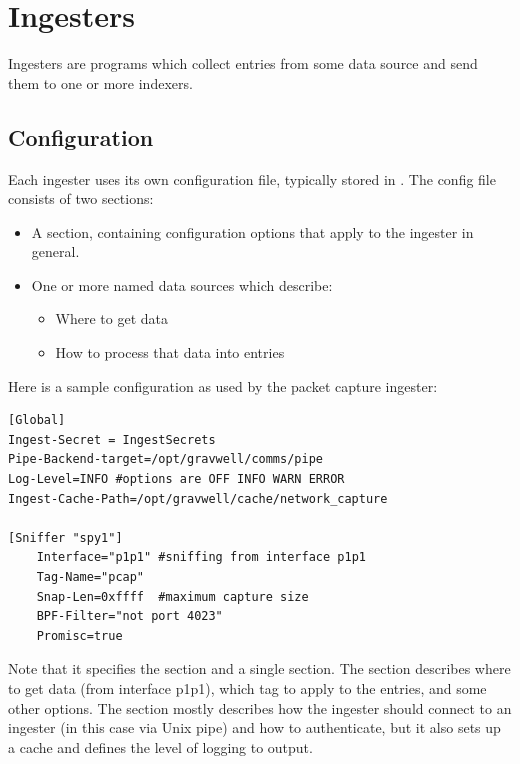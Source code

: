 \chapter{Ingesters}
Ingesters are programs which collect entries from some data source and
send them to one or more indexers.

\section{Configuration}
\label{sec:global-config}

Each ingester uses its own configuration file, typically stored in
. The config file consists of two sections:

\begin{itemize}
\item
  A \code{[Global]} section, containing configuration options that
  apply to the ingester in general.
\item
  One or more named data sources which describe:
	\begin{itemize}
	\item Where to get data
	\item How to process that data into entries
	\end{itemize}
\end{itemize}

Here is a sample configuration as used by the packet capture ingester:

\begin{Verbatim}[breaklines=true]
[Global]
Ingest-Secret = IngestSecrets
Pipe-Backend-target=/opt/gravwell/comms/pipe
Log-Level=INFO #options are OFF INFO WARN ERROR
Ingest-Cache-Path=/opt/gravwell/cache/network_capture

[Sniffer "spy1"]
    Interface="p1p1" #sniffing from interface p1p1
    Tag-Name="pcap"
    Snap-Len=0xffff  #maximum capture size
    BPF-Filter="not port 4023"
    Promisc=true
\end{Verbatim}

Note that it specifies the \code{[Global]} section and a single
\code{[Sniffer]} section. The \code{[Sniffer]} section describes where to get
data (from interface p1p1), which tag to apply to the entries, and some
other options. The \code{[Global]} section mostly describes how the
ingester should connect to an ingester (in this case via Unix pipe) and
how to authenticate, but it also sets up a cache and defines the level
of logging to output.

